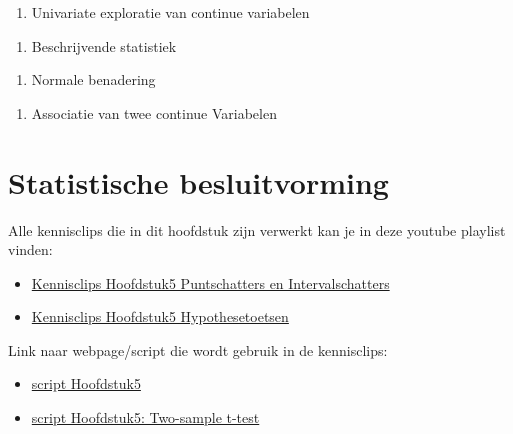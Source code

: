 \documentclass[
  12pt,dutch,coursenotes]{book}
\providecommand{\tightlist}{%
  \setlength{\itemsep}{0pt}\setlength{\parskip}{0pt}}
\theoremstyle{definition}
\theoremstyle{definition}
\theoremstyle{definition}
\theoremstyle{remark}
\begin{document}
\begin{enumerate}
\def\labelenumi{\arabic{enumi}.}
\tightlist
\item
  Univariate exploratie van continue variabelen
\end{enumerate}

\begin{enumerate}
\def\labelenumi{\arabic{enumi}.}
\setcounter{enumi}{1}
\tightlist
\item
  Beschrijvende statistiek
\end{enumerate}

\begin{enumerate}
\def\labelenumi{\arabic{enumi}.}
\setcounter{enumi}{2}
\tightlist
\item
  Normale benadering
\end{enumerate}

\begin{enumerate}
\def\labelenumi{\arabic{enumi}.}
\setcounter{enumi}{3}
\tightlist
\item
  Associatie van twee continue Variabelen
\end{enumerate}

\hypertarget{chap:besluit}{%
\chapter{Statistische besluitvorming}\label{chap:besluit}}

Alle kennisclips die in dit hoofdstuk zijn verwerkt kan je in deze youtube playlist vinden:

\begin{itemize}
\item
  \href{https://www.youtube.com/playlist?list=PLZH1hP8_LbJKyD9Jw5cqd-btYs11f9tkz}{Kennisclips Hoofdstuk5 Puntschatters en Intervalschatters}
\item
  \href{https://www.youtube.com/playlist?list=PLZH1hP8_LbJKEtDy2errIWf8hLJODw-jK}{Kennisclips Hoofdstuk5 Hypothesetoetsen}
\end{itemize}

Link naar webpage/script die wordt gebruik in de kennisclips:

\begin{itemize}
\item
  \href{https://statomics.github.io/sbc20/rmd/05-statisticalInference.html}{script Hoofdstuk5}
\item
  \href{https://statomics.github.io/sbc20/rmd/05-statisticalInference-twosampleT.html}{script Hoofdstuk5: Two-sample t-test}
\end{itemize}
\end{document}
